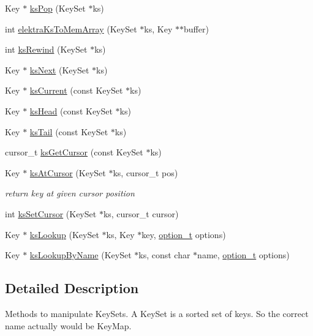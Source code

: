 \begin{DoxyCompactItemize}
\item 
Key $\ast$ \hyperlink{group__keyset_gae42530b04defb772059de0600159cf69}{ks\-Pop} (Key\-Set $\ast$ks)
\item 
int \hyperlink{group__keyset_gac3e995819383f904369c260f212125f5}{elektra\-Ks\-To\-Mem\-Array} (Key\-Set $\ast$ks, Key $\ast$$\ast$buffer)
\item 
int \hyperlink{group__keyset_gabe793ff51f1728e3429c84a8a9086b70}{ks\-Rewind} (Key\-Set $\ast$ks)
\item 
Key $\ast$ \hyperlink{group__keyset_ga317321c9065b5a4b3e33fe1c399bcec9}{ks\-Next} (Key\-Set $\ast$ks)
\item 
Key $\ast$ \hyperlink{group__keyset_ga4287b9416912c5f2ab9c195cb74fb094}{ks\-Current} (const Key\-Set $\ast$ks)
\item 
Key $\ast$ \hyperlink{group__keyset_gae7dbf3aef70e67b5328475eb3d1f92f5}{ks\-Head} (const Key\-Set $\ast$ks)
\item 
Key $\ast$ \hyperlink{group__keyset_gadca442c4ab43cf532b15091d7711559e}{ks\-Tail} (const Key\-Set $\ast$ks)
\item 
cursor\-\_\-t \hyperlink{group__keyset_gaffe507ab9281c322eb16c3e992075d29}{ks\-Get\-Cursor} (const Key\-Set $\ast$ks)
\item 
Key $\ast$ \hyperlink{group__keyset_ga3604cc41505f7e19db945cece67190b6}{ks\-At\-Cursor} (Key\-Set $\ast$ks, cursor\-\_\-t pos)
\begin{DoxyCompactList}\small\item\em return key at given cursor position \end{DoxyCompactList}\item 
int \hyperlink{group__keyset_gad94c9ffaa3e8034564c0712fd407c345}{ks\-Set\-Cursor} (Key\-Set $\ast$ks, cursor\-\_\-t cursor)
\item 
Key $\ast$ \hyperlink{group__keyset_gaa34fc43a081e6b01e4120daa6c112004}{ks\-Lookup} (Key\-Set $\ast$ks, Key $\ast$key, \hyperlink{group__keyset_ga98a3d6a4016c9dad9cbd1a99a9c2a45a}{option\-\_\-t} options)
\item 
Key $\ast$ \hyperlink{group__keyset_gad2e30fb6d4739d917c5abb2ac2f9c1a1}{ks\-Lookup\-By\-Name} (Key\-Set $\ast$ks, const char $\ast$name, \hyperlink{group__keyset_ga98a3d6a4016c9dad9cbd1a99a9c2a45a}{option\-\_\-t} options)
\end{DoxyCompactItemize}


\subsection{Detailed Description}
Methods to manipulate Key\-Sets. A Key\-Set is a sorted set of keys. So the correct name actually would be Key\-Map.

